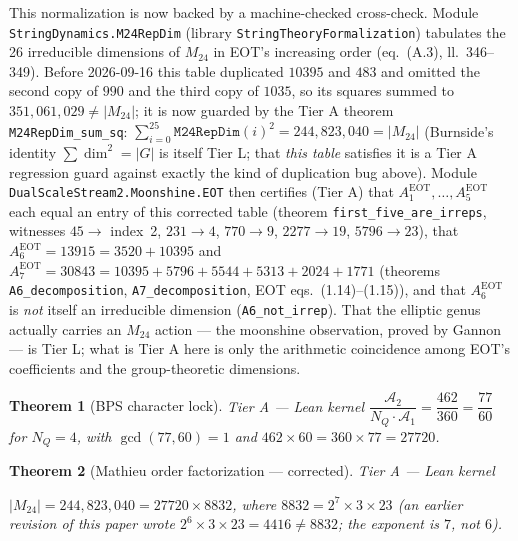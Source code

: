 \documentclass[11pt,a4paper]{article}
\newtheorem{theorem}{Theorem}[section]
\theoremstyle{remark}
\newcommand{\tierA}{\colorbox{green!15}{\textsf{\scriptsize Tier A --- Lean kernel}}}
\begin{document}
\begin{scopebox}
This normalization is now backed by a machine-checked cross-check. Module
\texttt{StringDynamics.\discretionary{}{}{}M24RepDim} (library \texttt{StringTheoryFormalization})
tabulates the 26 irreducible dimensions of $M_{24}$ in EOT's increasing order (eq.~(A.3),
ll.~346--349). Before 2026-09-16 this table duplicated $10395$ and $483$ and omitted the second copy
of $990$ and the third copy of $1035$, so its squares summed to $351{,}061{,}029\ne|M_{24}|$; it is
now guarded by the Tier A theorem \texttt{M24RepDim\_\discretionary{}{}{}sum\_\discretionary{}{}{}sq}:
$\sum_{i=0}^{25}\texttt{M24RepDim}(i)^2 = 244{,}823{,}040=|M_{24}|$ (Burnside's identity
$\sum\dim^2=|G|$ is itself Tier L; that \emph{this table} satisfies it is a Tier A regression guard
against exactly the kind of duplication bug above). Module
\texttt{DualScaleStream2.\discretionary{}{}{}Moonshine.\discretionary{}{}{}EOT} then certifies (Tier
A) that $A_1^{\mathrm{EOT}},\dots,A_5^{\mathrm{EOT}}$ each equal an entry of this corrected table
(theorem \texttt{first\_\discretionary{}{}{}five\_\discretionary{}{}{}are\_\discretionary{}{}{}irreps},
witnesses $45\to$ index~2, $231\to4$, $770\to9$, $2277\to19$, $5796\to23$), that
$A_6^{\mathrm{EOT}}=13915=3520+10395$ and $A_7^{\mathrm{EOT}}=30843=10395+5796+5544+5313+2024+1771$
(theorems \texttt{A6\_\discretionary{}{}{}decomposition}, \texttt{A7\_\discretionary{}{}{}decomposition},
EOT eqs.~(1.14)--(1.15)), and that $A_6^{\mathrm{EOT}}$ is \emph{not} itself an irreducible dimension
(\texttt{A6\_\discretionary{}{}{}not\_\discretionary{}{}{}irrep}). That the elliptic genus actually
carries an $M_{24}$ action --- the moonshine observation, proved by Gannon \cite{Gannon2013} --- is
Tier L; what is Tier A here is only the arithmetic coincidence among EOT's coefficients and the
group-theoretic dimensions.
\end{scopebox}

\begin{theorem}[BPS character lock] \label{thm:bpslock} \tierA
$\dfrac{\mathcal A_2}{N_Q\cdot \mathcal A_1} = \dfrac{462}{360} = \dfrac{77}{60}$ for $N_Q=4$, with $\gcd(77,60)=1$ and
$462\times60 = 360\times77 = 27720$.
\end{theorem}

\begin{theorem}[Mathieu order factorization --- corrected] \label{thm:mathieufactor} \tierA\par\smallskip\noindent
$|M_{24}| = 244{,}823{,}040 = 27720\times 8832$, where $8832 = 2^7\times3\times23$ (an earlier
revision of this paper wrote $2^6\times3\times23=4416\ne8832$; the exponent is $7$, not $6$).
\end{theorem}
\end{document}
